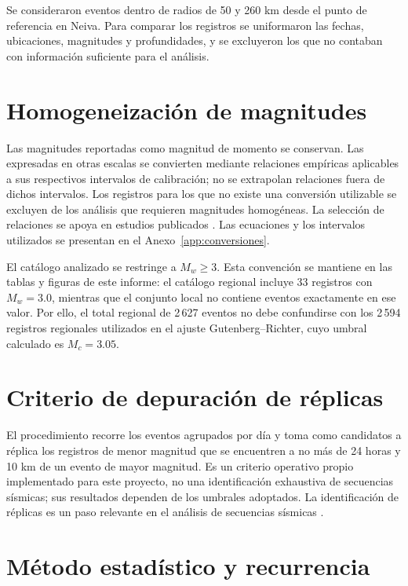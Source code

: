 \documentclass[12pt,oneside]{report}
\begin{document}
Se consideraron eventos dentro de radios de 50 y 260 km desde el punto de
referencia en Neiva. Para comparar los registros se uniformaron las fechas,
ubicaciones, magnitudes y profundidades, y se excluyeron los que no contaban
con información suficiente para el análisis.


\section{Homogeneización de magnitudes}

Las magnitudes reportadas como magnitud de momento se conservan. Las
expresadas en otras escalas se convierten mediante relaciones empíricas
aplicables a sus respectivos intervalos de calibración; no se extrapolan
relaciones fuera de dichos intervalos. Los registros para los que no existe
una conversión utilizable se excluyen de los análisis que requieren magnitudes
homogéneas. La selección de relaciones se apoya en estudios publicados
\parencite{bormann2005globally,lolli2014empirical,senel2016new}.
Las ecuaciones y los intervalos utilizados se presentan en el
Anexo~\ref{app:conversiones}.

El catálogo analizado se restringe a $M_w\geq3$. Esta convención se mantiene
en las tablas y figuras de este informe: el catálogo regional incluye 33
registros con $M_w=3.0$, mientras que el conjunto local no contiene eventos
exactamente en ese valor. Por ello, el total regional de 2\,627 eventos no
debe confundirse con los 2\,594 registros regionales utilizados en el ajuste
Gutenberg--Richter, cuyo umbral calculado es $M_c=3.05$.

\section{Criterio de depuración de réplicas}

El procedimiento recorre los eventos agrupados por día y toma como candidatos
a réplica los registros de menor magnitud que se encuentren a no más de 24
horas y 10 km de un evento de mayor magnitud. Es un criterio operativo propio
implementado para este proyecto, no una identificación exhaustiva de
secuencias sísmicas; sus resultados dependen de los umbrales adoptados. La
identificación de réplicas es un paso relevante en el análisis de secuencias
sísmicas \parencite{gardner1974isoseismal}.

\section{Método estadístico y recurrencia}
\label{sec:metodo-recurrencia}
\end{document}
